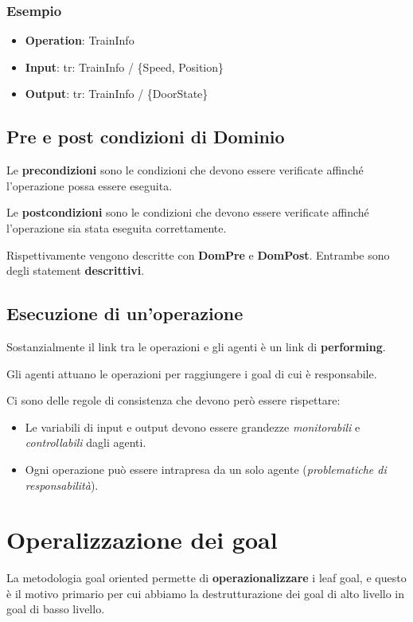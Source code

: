 \subsubsection{Esempio}
\begin{itemize}
    \item \textbf{Operation}: TrainInfo
    \item \textbf{Input}: tr: TrainInfo / \{Speed, Position\}
    \item \textbf{Output}: tr: TrainInfo / \{DoorState\}
\end{itemize}
\subsection{Pre e post condizioni di Dominio}
\begin{tcolorbox}[colback=yellow!5!white,colframe=yellow!75!black, title=Precondizioni]
    Le \textbf{precondizioni} sono le condizioni che devono essere verificate
    affinché l'operazione possa essere eseguita.
\end{tcolorbox}
\begin{tcolorbox}[colback=orange!5!white,colframe=orange!75!black, title=Postcondizioni]
    Le \textbf{postcondizioni} sono le condizioni che devono essere verificate
    affinché l'operazione sia stata eseguita correttamente.
\end{tcolorbox}
Rispettivamente vengono descritte con \textbf{DomPre} e \textbf{DomPost}. Entrambe sono 
degli statement \textbf{descrittivi}. 
\subsection{Esecuzione di un'operazione}
Sostanzialmente il link tra le operazioni e gli agenti è un link di \textbf{performing}.
\begin{tcolorbox}
    Gli agenti attuano le operazioni per raggiungere i goal di cui è responsabile.
\end{tcolorbox}
Ci sono delle regole di consistenza che devono però essere rispettare:
\begin{itemize}
    \item Le variabili di input e output devono essere grandezze \textit{monitorabili}
    e \textit{controllabili} dagli agenti.
    \item Ogni operazione può essere intrapresa da un solo agente (\textit{problematiche 
    di responsabilità}).
\end{itemize}
\section{Operalizzazione dei goal}
La metodologia goal oriented permette di \textbf{operazionalizzare} i leaf goal, e questo 
è il motivo primario per cui abbiamo la destrutturazione dei goal di alto livello in goal
di basso livello.
